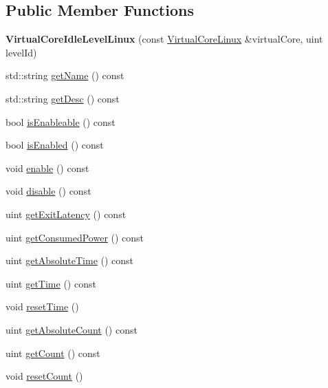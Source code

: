 \subsection*{Public Member Functions}
\begin{DoxyCompactItemize}
\item 
\hypertarget{classmammut_1_1topology_1_1VirtualCoreIdleLevelLinux_acf7351be50943f449a4e8ea9e5edab8e}{{\bfseries Virtual\-Core\-Idle\-Level\-Linux} (const \hyperlink{classmammut_1_1topology_1_1VirtualCoreLinux}{Virtual\-Core\-Linux} \&virtual\-Core, uint level\-Id)}\label{classmammut_1_1topology_1_1VirtualCoreIdleLevelLinux_acf7351be50943f449a4e8ea9e5edab8e}

\item 
std\-::string \hyperlink{classmammut_1_1topology_1_1VirtualCoreIdleLevelLinux_a4d0c99fe50c44565a89d4e786155cc29}{get\-Name} () const 
\item 
std\-::string \hyperlink{classmammut_1_1topology_1_1VirtualCoreIdleLevelLinux_ada6efb51f70381313b2f3cc1cb3e05fd}{get\-Desc} () const 
\item 
bool \hyperlink{classmammut_1_1topology_1_1VirtualCoreIdleLevelLinux_ac49db1fa35fe5daf4ab06ca83d6de094}{is\-Enableable} () const 
\item 
bool \hyperlink{classmammut_1_1topology_1_1VirtualCoreIdleLevelLinux_ab8a5d122ff265bf697f876b4251f9710}{is\-Enabled} () const 
\item 
void \hyperlink{classmammut_1_1topology_1_1VirtualCoreIdleLevelLinux_a4d82214c9edc3fa8bdc086d11d6d1709}{enable} () const 
\item 
void \hyperlink{classmammut_1_1topology_1_1VirtualCoreIdleLevelLinux_a658a09a3745a68f2891a6296bf8e1535}{disable} () const 
\item 
uint \hyperlink{classmammut_1_1topology_1_1VirtualCoreIdleLevelLinux_a210b830afccb7a6231d8a6298d768bb7}{get\-Exit\-Latency} () const 
\item 
uint \hyperlink{classmammut_1_1topology_1_1VirtualCoreIdleLevelLinux_ac28a040abfa4686d5188cd6f622eb304}{get\-Consumed\-Power} () const 
\item 
uint \hyperlink{classmammut_1_1topology_1_1VirtualCoreIdleLevelLinux_a6c3c8d98625d1827dad0f837fb859e95}{get\-Absolute\-Time} () const 
\item 
uint \hyperlink{classmammut_1_1topology_1_1VirtualCoreIdleLevelLinux_ada0465d3c7030b85356bbd4e9222a44f}{get\-Time} () const 
\item 
void \hyperlink{classmammut_1_1topology_1_1VirtualCoreIdleLevelLinux_a811bcebcc8264a9d033859f5489e7f77}{reset\-Time} ()
\item 
uint \hyperlink{classmammut_1_1topology_1_1VirtualCoreIdleLevelLinux_a0e40c5b94ee5bcef57b09db4b03faeb2}{get\-Absolute\-Count} () const 
\item 
uint \hyperlink{classmammut_1_1topology_1_1VirtualCoreIdleLevelLinux_a877fb980f4d1caf19bac4efc573c89d0}{get\-Count} () const 
\item 
void \hyperlink{classmammut_1_1topology_1_1VirtualCoreIdleLevelLinux_a0e5fed9b3e8a2477c27b9d4e902525bf}{reset\-Count} ()
\end{DoxyCompactItemize}
